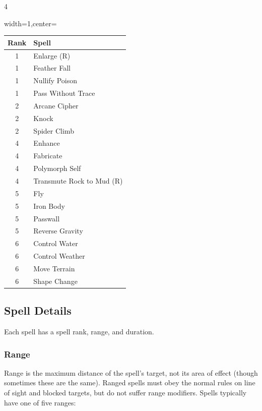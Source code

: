 \documentclass{book}
\begin{document}
\begin{multicols}{4}
\begin{table}[H]
	\begin{adjustbox}{width=1\columnwidth,center=\columnwidth}
		\begin{tabular}{cl}
			\toprule
			Rank & Spell \\
			\midrule
	1 & Enlarge (R) \\
	1 & Feather Fall \\
	1 & Nullify Poison \\
	1 & Pass Without Trace \\
	2 & Arcane Cipher \\
	2 & Knock \\
	2 & Spider Climb \\
	4 & Enhance \\
	4 & Fabricate \\
	4 & Polymorph Self \\
	4 & Transmute Rock to Mud (R) \\
	5 & Fly \\
	5 & Iron Body \\
	5 & Passwall \\
	5 & Reverse Gravity \\
	6 & Control Water \\
	6 & Control Weather \\
	6 & Move Terrain \\
	6 & Shape Change \\
			\bottomrule
\end{tabular}
\end{adjustbox}
\end{table}

\end{multicols}
\newpage

\subsection*{Spell Details}\label{spell-details}

Each spell has a spell rank, range, and duration.

\subsubsection*{Range}\label{range}

Range is the maximum distance of the spell's target, not its area of
effect (though sometimes these are the same). Ranged spells must obey
the normal rules on line of sight and blocked targets, but do not suffer
range modifiers. Spells typically have one of five ranges:
\end{document}
